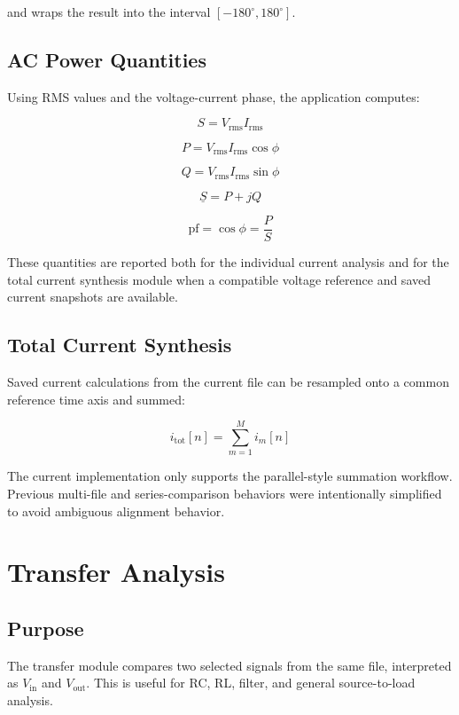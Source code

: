 \documentclass[conference]{IEEEtran}
\begin{document}
and wraps the result into the interval $[-180^\circ, 180^\circ]$.

\subsection{AC Power Quantities}
Using RMS values and the voltage-current phase, the application computes:

\begin{equation}
S = V_{\mathrm{rms}} I_{\mathrm{rms}}
\end{equation}

\begin{equation}
P = V_{\mathrm{rms}} I_{\mathrm{rms}} \cos\phi
\end{equation}

\begin{equation}
Q = V_{\mathrm{rms}} I_{\mathrm{rms}} \sin\phi
\end{equation}

\begin{equation}
\underline{S} = P + jQ
\end{equation}

\begin{equation}
\mathrm{pf} = \cos\phi = \frac{P}{S}
\end{equation}

These quantities are reported both for the individual current analysis and for the total current synthesis module when a compatible voltage reference and saved current snapshots are available.

\subsection{Total Current Synthesis}
Saved current calculations from the current file can be resampled onto a common reference time axis and summed:

\begin{equation}
i_{\mathrm{tot}}[n] = \sum_{m=1}^{M} i_m[n]
\end{equation}

The current implementation only supports the parallel-style summation workflow. Previous multi-file and series-comparison behaviors were intentionally simplified to avoid ambiguous alignment behavior.

\section{Transfer Analysis}
\subsection{Purpose}
The transfer module compares two selected signals from the same file, interpreted as $V_{\mathrm{in}}$ and $V_{\mathrm{out}}$. This is useful for RC, RL, filter, and general source-to-load analysis.
\end{document}
